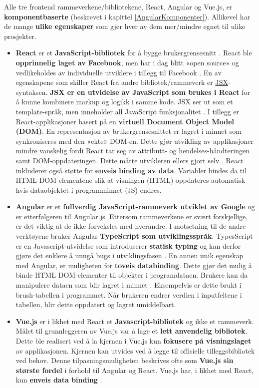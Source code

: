 Alle tre frontend rammeverkene/bibliotekene, React, Angular og Vue.js, er \textbf{komponentbaserte} (beskrevet i kapittel \ref{AngularKomponenter}). Allikevel har de mange \textbf{ulike egenskaper} som gjør hver av dem mer/mindre egnet til ulike prosjekter.
\begin{itemize}
    \item \textbf{React} er et \textbf{JavaScript-bibliotek} for å bygge brukergrensesnitt \cite{reactHistory}. React ble \textbf{opprinnelig laget av Facebook}, men har i dag blitt «open source» og vedlikeholdes av individuelle utviklere i tillegg til Facebook \cite{reactGithub}. En av egenskapene som skiller React fra andre bibliotek/rammeverk er \href{https://reactjs.org/docs/introducing-jsx.html}{JSX}-syntaksen. \textbf{JSX er en utvidelse av JavaScript som brukes i React} for å kunne kombinere markup og logikk i samme kode. JSX ser ut som et template-språk, men inneholder all JavaScript funksjonalitet \cite{IntroJSX}. I tillegg er React-applikasjoner basert på en \textbf{virtuell Document Object Model (DOM)}. En representasjon av brukergrensesnittet er lagret i minnet som synkroniseres med den «ekte» DOM-en. Dette gjør utvikling av applikasjoner mindre vanskelig fordi React tar seg av attributt- og  hendelses-håndteringen samt DOM-oppdateringen. Dette måtte utvikleren ellers gjort selv \cite{reactVirtualDOM}. React inkluderer også støtte for \textbf{enveis binding av data}. Variabler bindes da til HTML DOM-elementene slik at visningen (HTML) oppdateres automatisk hvis dataobjektet i programminnet (JS) endres.
    
    \item \textbf{Angular} er et \textbf{fullverdig JavaScript-rammeverk utviklet av Google} og er etterfølgeren til Angular.js. Ettersom rammeverkene er svært forskjellige, er det viktig at de ikke forveksles med hverandre. I motsetning til de andre verktøyene bruker Angular \textbf{TypeScript som utviklingsspråk}. TypesScript er en Javascript-utvidelse som introduserer \textbf{statisk typing} og kan derfor gjøre det enklere å unngå bugs i utviklingsfasen \cite{staticTyping}. En annen unik egenskap med Angular, er muligheten for \textbf{toveis databinding}. Dette gjør det mulig å binde HTML DOM-elementer til objekter i programdataen. Brukere kan da manipulere dataen som blir lagret i minnet \cite{AngularInformation}. Eksempelvis er dette brukt i brush-tabellen i programmet. Når brukeren endrer verdien i inputfeltene i tabellen, blir dette oppdatert og lagret umiddelbart.
    
    \item \textbf{Vue.js} er i likhet med React et \textbf{Javascript-bibliotek} og ikke et rammeverk. Målet til grunnleggeren av Vue.js var å lage et \textbf{lett anvendelig bibliotek}. Dette ble realisert ved å la kjernen i Vue.js kun \textbf{fokusere på visningslaget} av applikasjonen. Kjernen kan utvides ved å legge til offisielle tilleggsbibliotek ved behov. Denne tilpasningsmuligheten beskrives ofte som \textbf{Vue.js sin største fordel} i forhold til Angular og React. Vue.js har, i likhet med React, kun \textbf{enveis data binding} \cite{VueInformation}.
\end{itemize}

